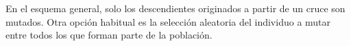 \documentclass[a4paper,12pt]{book}
\begin{document}
		En el esquema general, solo los descendientes originados a partir de un cruce son mutados. Otra opción habitual es la selección aleatoria del individuo a mutar entre todos los que forman parte de la población.
		



\end{document}
